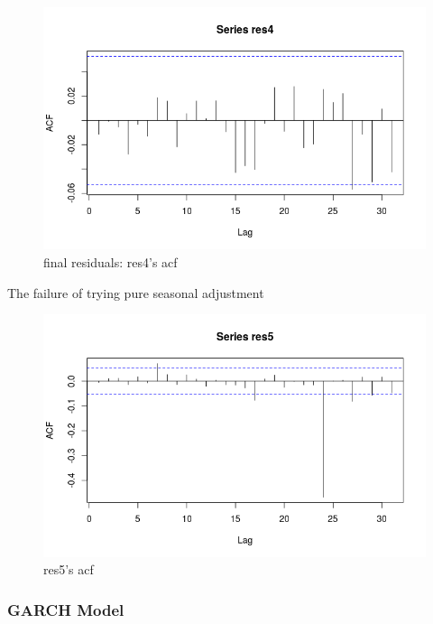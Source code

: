 \documentclass[a4paper,11pt]{article}
\begin{document}
\begin{figure}[H]
\centering
\caption{final residuals: res4's acf}
\includegraphics[scale=.70]{final_residuals_acf.png}
\end{figure}

The failure of trying pure seasonal adjustment

\begin{figure}[H]
\centering
\caption{res5's acf}
\includegraphics[scale=.70]{res5_acf.png}
\end{figure}


\subsubsection{GARCH Model}
\end{document}
